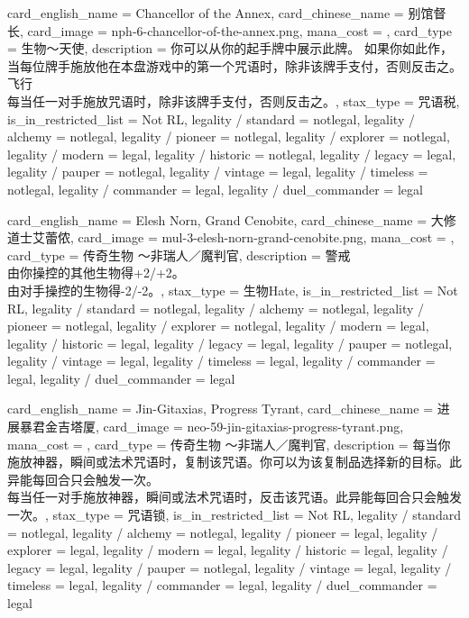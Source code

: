 \documentclass[lang = cn, color = black, 10pt]{AllThatStax}
\begin{document}
\card
{
	card_english_name = {Chancellor of the Annex},
	card_chinese_name = {别馆督长},
	card_image = nph-6-chancellor-of-the-annex.png,
	mana_cost = ,
	card_type = 生物～天使,
	description = {你可以从你的起手牌中展示此牌。 如果你如此作，当每位牌手施放他在本盘游戏中的第一个咒语时，除非该牌手支付，否则反击之。\\
		飞行\\
		每当任一对手施放咒语时，除非该牌手支付，否则反击之。},
	stax_type = 咒语税,
	is_in_restricted_list = Not RL,
	legality / standard = notlegal,
	legality / alchemy = notlegal,
	legality / pioneer = notlegal,
	legality / explorer = notlegal,
	legality / modern = legal,
	legality / historic = notlegal,
	legality / legacy = legal,
	legality / pauper = notlegal,
	legality / vintage = legal,
	legality / timeless = notlegal,
	legality / commander = legal,
	legality / duel_commander = legal
}

\card
{
	card_english_name = {Elesh Norn, Grand Cenobite},
	card_chinese_name = {大修道士艾蕾侬},
	card_image = mul-3-elesh-norn-grand-cenobite.png,
	mana_cost = ,
	card_type = 传奇生物 ～非瑞人／魔判官,
	description = {警戒\\
		由你操控的其他生物得+2/+2。\\
		由对手操控的生物得-2/-2。},
	stax_type = 生物Hate,
	is_in_restricted_list = Not RL,
	legality / standard = notlegal,
	legality / alchemy = notlegal,
	legality / pioneer = notlegal,
	legality / explorer = notlegal,
	legality / modern = legal,
	legality / historic = legal,
	legality / legacy = legal,
	legality / pauper = notlegal,
	legality / vintage = legal,
	legality / timeless = legal,
	legality / commander = legal,
	legality / duel_commander = legal
}

\card
{
	card_english_name = {Jin-Gitaxias, Progress Tyrant},
	card_chinese_name = {进展暴君金吉塔厦},
	card_image = neo-59-jin-gitaxias-progress-tyrant.png,
	mana_cost = ,
	card_type = 传奇生物 ～非瑞人／魔判官,
	description = {每当你施放神器，瞬间或法术咒语时，复制该咒语。你可以为该复制品选择新的目标。此异能每回合只会触发一次。\\
		每当任一对手施放神器，瞬间或法术咒语时，反击该咒语。此异能每回合只会触发一次。},
	stax_type = 咒语锁,
	is_in_restricted_list = Not RL,
	legality / standard = notlegal,
	legality / alchemy = notlegal,
	legality / pioneer = legal,
	legality / explorer = legal,
	legality / modern = legal,
	legality / historic = legal,
	legality / legacy = legal,
	legality / pauper = notlegal,
	legality / vintage = legal,
	legality / timeless = legal,
	legality / commander = legal,
	legality / duel_commander = legal
}
\end{document}

